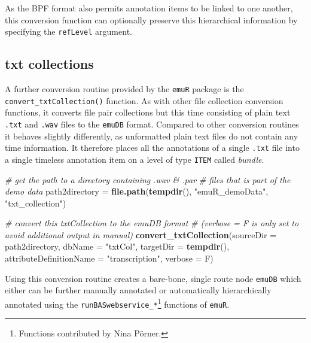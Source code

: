 \documentclass[]{book}
\newenvironment{Shaded}{\begin{snugshade}}{\end{snugshade}}
\newcommand{\CommentTok}[1]{\textcolor[rgb]{0.56,0.35,0.01}{\textit{#1}}}
\newcommand{\DataTypeTok}[1]{\textcolor[rgb]{0.13,0.29,0.53}{#1}}
\newcommand{\KeywordTok}[1]{\textcolor[rgb]{0.13,0.29,0.53}{\textbf{#1}}}
\newcommand{\NormalTok}[1]{#1}
\newcommand{\StringTok}[1]{\textcolor[rgb]{0.31,0.60,0.02}{#1}}
\begin{document}
As the BPF format also permits annotation items to be linked to one another, this conversion function can optionally preserve this hierarchical information by specifying the \texttt{refLevel} argument.

\hypertarget{txt-collections}{%
\subsection{txt collections}\label{txt-collections}}

A further conversion routine provided by the \texttt{emuR} package is the \texttt{convert\_txtCollection()} function. As with other file collection conversion functions, it converts file pair collections but this time consisting of plain text \texttt{.txt} and \texttt{.wav} files to the \texttt{emuDB} format. Compared to other conversion routines it behaves slightly differently, as unformatted plain text files do not contain any time information. It therefore places all the annotations of a single \texttt{.txt} file into a single timeless annotation item on a level of type \texttt{ITEM} called \emph{bundle}.

\begin{Shaded}
\begin{Highlighting}[]
\CommentTok{# get the path to a directory containing .wav & .par}
\CommentTok{# files that is part of the demo data}
\NormalTok{path2directory =}\StringTok{ }\KeywordTok{file.path}\NormalTok{(}\KeywordTok{tempdir}\NormalTok{(),}
                           \StringTok{"emuR_demoData"}\NormalTok{,}
                           \StringTok{"txt_collection"}\NormalTok{)}

\CommentTok{# convert this txtCollection to the emuDB format}
\CommentTok{# (verbose = F is only set to avoid additional output in manual)}
\KeywordTok{convert_txtCollection}\NormalTok{(}\DataTypeTok{sourceDir =}\NormalTok{ path2directory,}
                      \DataTypeTok{dbName =} \StringTok{"txtCol"}\NormalTok{,}
                      \DataTypeTok{targetDir =} \KeywordTok{tempdir}\NormalTok{(),}
                      \DataTypeTok{attributeDefinitionName =} \StringTok{"transcription"}\NormalTok{,}
                      \DataTypeTok{verbose =}\NormalTok{ F)}
\end{Highlighting}
\end{Shaded}

Using this conversion routine creates a bare-bone, single route node \texttt{emuDB} which either can be further manually annotated or automatically hierarchically annotated using the \texttt{runBASwebservice\_*}\footnote{Functions contributed by Nina Pörner.} functions of \texttt{emuR}.
\end{document}
